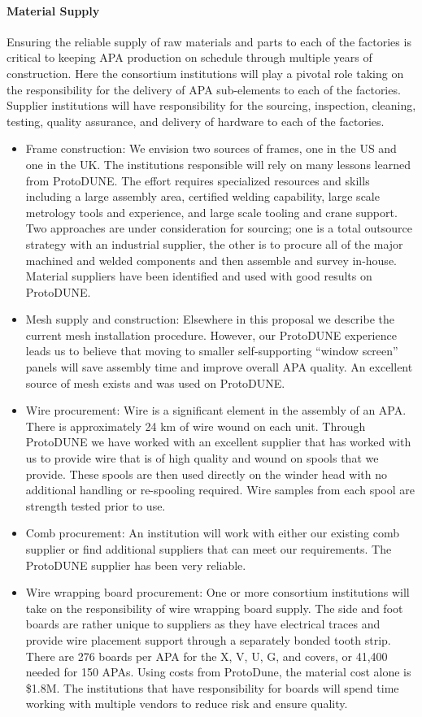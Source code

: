 \paragraph{Material Supply}  Ensuring the reliable supply of raw materials and parts to each of the factories is critical to keeping APA production on schedule through multiple years of construction. Here the consortium institutions will play a pivotal role taking on the responsibility for the delivery of APA sub-elements to each of the factories. Supplier institutions will have responsibility for the sourcing, inspection, cleaning, testing, quality assurance, and delivery of hardware to each of the factories.   
\begin{itemize}
\item Frame construction: We envision two sources of frames, one in the US and one in the UK. The institutions responsible will rely on many lessons learned from ProtoDUNE. The effort requires specialized resources and skills including a large assembly area, certified welding capability, large scale metrology tools and experience, and large scale tooling and crane support. Two approaches are under consideration for sourcing; one is a total outsource strategy with an industrial supplier, the other is to procure all of the major machined and welded components and then assemble and survey in-house. Material suppliers have been identified and used with good results on ProtoDUNE.
\item Mesh supply and construction: Elsewhere in this proposal we describe the current mesh installation procedure. However, our ProtoDUNE experience leads us to believe that moving to smaller self-supporting ``window screen'' panels will save assembly time and improve overall APA quality. An excellent source of mesh exists and was used on ProtoDUNE.
\item Wire procurement: Wire is a significant element in the assembly of an APA. There is approximately 24 km of wire wound on each unit. Through ProtoDUNE we have worked with an excellent supplier that has worked with us to provide wire that is of high quality and wound on spools that we provide. These spools are then used directly on the winder head with no additional handling or re-spooling required. Wire samples from each spool are strength tested prior to use.
\item Comb procurement: An institution will work with either our existing comb supplier or find additional suppliers that can meet our requirements. The ProtoDUNE supplier has been very reliable.
\item Wire wrapping board procurement: One or more consortium institutions will take on the responsibility of wire wrapping board supply. The side and foot boards are rather unique to suppliers as they have electrical traces and provide wire placement support through a separately bonded tooth strip. There are 276 boards per APA for the X, V, U, G, and covers, or 41,400 needed for 150 APAs. Using costs from ProtoDune, the material cost alone is \$1.8M. The institutions that have responsibility for boards will spend time working with multiple vendors to reduce risk and ensure quality. 

\end{itemize}
